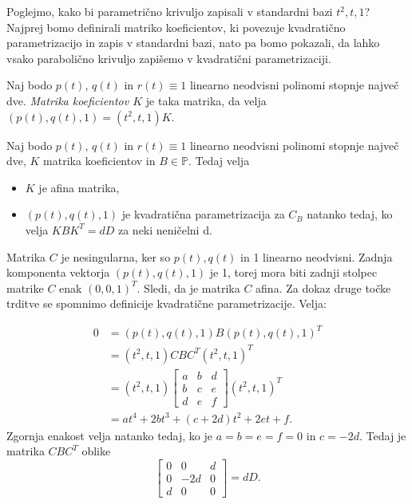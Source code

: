 \documentclass[mat1]{fmfdelo}
\newcommand{\PP}{\mathbb P}
\begin{document}
Poglejmo, kako bi parametrično krivuljo zapisali v standardni bazi $t^2, t, 1$? Najprej bomo definirali matriko koeficientov, ki povezuje kvadratično parametrizacijo in zapis v standardni bazi, nato pa bomo pokazali, da lahko vsako parabolično krivuljo zapišemo v kvadratični parametrizaciji.

\begin{definicija}
Naj bodo $p(t)$, $q(t)$ in $r(t) \equiv 1$ linearno neodvisni polinomi stopnje največ dve. \emph{Matrika koeficientov $K$} je taka matrika, da velja $ (p(t), q(t), 1) = (t^2,t,1) K$.
\end{definicija} 

\begin{trditev}
Naj bodo $p(t)$, $q(t)$ in $r(t) \equiv 1$ linearno neodvisni polinomi stopnje največ dve, $K$ matrika koeficientov in $B \in \PP$. Tedaj velja
\begin{itemize}
\item $K$ je afina matrika,
\item  $ ( p(t), q(t), 1)$ je kvadratična parametrizacija za $C_B$ natanko tedaj, ko velja $K B K^T = d D$ za neki neničelni d.
\end{itemize}
\end{trditev}

\begin{dokaz}
Matrika $C$ je nesingularna, ker so $p(t), q(t)$ in 1 linearno neodvisni. Zadnja komponenta vektorja $(p(t), q(t), 1)$ je 1, torej mora biti zadnji stolpec matrike $C$ enak $(0,0,1)^T$. Sledi, da je matrika $C$ afina. Za dokaz druge točke trditve se spomnimo definicije kvadratične parametrizacije. Velja:

\begin{align*}
0 &= (p(t), q(t), 1) B (p(t), q(t), 1)^T \\
   &= (t^2, t, 1) C B C^T (t^2, t, 1)^T \\
   &= (t^2, t, 1) 
\begin{bmatrix}
a & b & d \\
b & c & e \\
d & e & f
\end{bmatrix}
(t^2, t, 1)^T \\
   &= a t^4 + 2 b t^3 + (c+2d)t^2 + 2et + f
.\end{align*}
Zgornja enakost velja natanko tedaj, ko je $a=b=e=f=0$ in $c=-2d$. Tedaj je matrika $CBC^T$ oblike
$$
\begin{bmatrix}
0 & 0 & d \\
0 & -2d & 0 \\
d & 0 & 0
\end{bmatrix}
=
dD.
$$
\end{dokaz}
\end{document}
